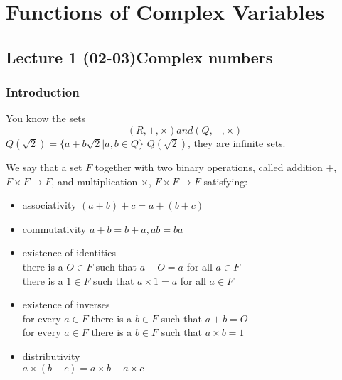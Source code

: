 \chapter[Functions of Complex Variables]{Functions of Complex Variables}
\section[Lecture 1 (02-03) -- {Complex numbers}]{Lecture 1 (02-03)Complex numbers}

\subsection{Introduction}

You know the sets $$ (R,+,\times ) and (Q,+,\times) $$
$ Q(\sqrt{2})=\{a+b\sqrt{2} | a,b \in Q\} $ $Q(\sqrt{2})$, they are infinite sets.


\begin{definition}[Fields]{}
    We say that a set $F$ together with two binary operations, called addition $+$,$F \times F \to F$, and multiplication $\times$, $F \times F \to F$ satisfying: 
    \begin{itemize}
        \item associativity $(a+b)+c=a+(b+c)$
        \item commutativity  $a+b=b+a,ab=ba$
        \item existence of identities\\there is a $O \in F$ such that $a+O=a$ for all $a \in F$\\there is a $1 \in F$ such that $a \times 1=a$ for all $a \in F$
        \item existence of inverses \\for every $a \in F$ there is a $b \in F$ such that $a+b=O$\\for every $a \in F$ there is a $b \in F$ such that $a \times b=1$
        \item distributivity\\$a \times (b+c)=a \times b+a \times c$
    \end{itemize}
    \end{definition}


